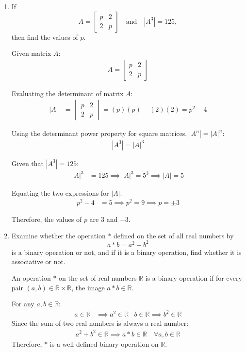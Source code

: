 \begin{enumerate}[label=\thesubsection.\arabic*, ref=\thesubsection.\theenumi]
\item If
\[
A=\begin{bmatrix}p&2\\2&p\end{bmatrix}
\quad\text{and}\quad |A^3|=125,
\]
then find the values of $p$.

\solution
Given matrix $A$:
\begin{align*}
	A = \begin{bmatrix} p & 2 \\ 2 & p \end{bmatrix}
\end{align*}

Evaluating the determinant of matrix $A$:
\begin{align*}
	|A| &= \begin{vmatrix} p & 2 \\ 2 & p \end{vmatrix} = (p)(p) - (2)(2) = p^2 - 4
\end{align*}

Using the determinant power property for square matrices, $|A^n| = |A|^n$:
\begin{align*}
	|A^3| = |A|^3
\end{align*}

Given that $|A^3| = 125$:
\begin{align*}
	|A|^3 &= 125 \implies |A|^3 = 5^3 \implies |A| = 5
\end{align*}

Equating the two expressions for $|A|$:
\begin{align*}
	p^2 - 4 &= 5 \implies p^2 = 9 \implies p = \pm 3
\end{align*}

Therefore, the values of $p$ are $3$ and $-3$.


\item Examine whether the operation $*$ defined on the set of all real numbers by
\[
a*b=a^2+b^2
\]
is a binary operation or not, and if it is a binary operation, find whether it is associative or not.

\solution

An operation $*$ on the set of real numbers $\mathbb{R}$ is a binary operation if for every pair $(a, b) \in \mathbb{R} \times \mathbb{R}$, the image $a * b \in \mathbb{R}$.

For any $a, b \in \mathbb{R}$:
\begin{align*}
	a \in \mathbb{R} &\implies a^2 \in \mathbb{R} &
	b \in \mathbb{R} \implies b^2 \in \mathbb{R}
\end{align*}
Since the sum of two real numbers is always a real number:
\begin{align*}
	a^2 + b^2 \in \mathbb{R} \implies a * b \in \mathbb{R} \quad \forall a, b \in \mathbb{R}
\end{align*}
Therefore, $*$ is a well-defined binary operation on $\mathbb{R}$.


\end{enumerate}
